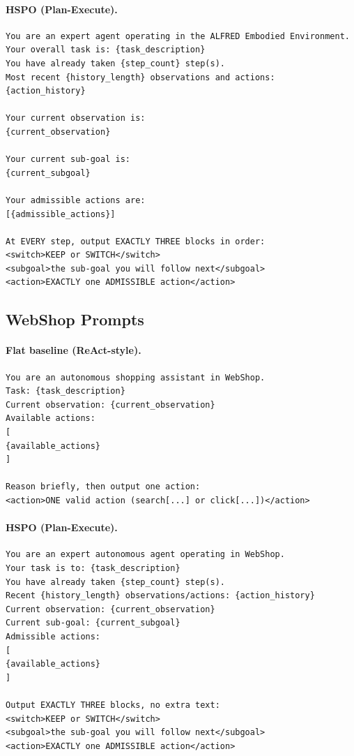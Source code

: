 \documentclass{article}
\begin{document}
\paragraph{HSPO (Plan-Execute).}
\begin{lstlisting}
You are an expert agent operating in the ALFRED Embodied Environment.
Your overall task is: {task_description}
You have already taken {step_count} step(s).
Most recent {history_length} observations and actions:
{action_history}

Your current observation is:
{current_observation}

Your current sub-goal is:
{current_subgoal}

Your admissible actions are:
[{admissible_actions}]

At EVERY step, output EXACTLY THREE blocks in order:
<switch>KEEP or SWITCH</switch>
<subgoal>the sub-goal you will follow next</subgoal>
<action>EXACTLY one ADMISSIBLE action</action>
\end{lstlisting}

\subsection{WebShop Prompts}
\label{app:webshop_prompts}

\paragraph{Flat baseline (ReAct-style).}
\begin{lstlisting}
You are an autonomous shopping assistant in WebShop.
Task: {task_description}
Current observation: {current_observation}
Available actions:
[
{available_actions}
]

Reason briefly, then output one action:
<action>ONE valid action (search[...] or click[...])</action>
\end{lstlisting}

\paragraph{HSPO (Plan-Execute).}
\begin{lstlisting}
You are an expert autonomous agent operating in WebShop.
Your task is to: {task_description}
You have already taken {step_count} step(s).
Recent {history_length} observations/actions: {action_history}
Current observation: {current_observation}
Current sub-goal: {current_subgoal}
Admissible actions:
[
{available_actions}
]

Output EXACTLY THREE blocks, no extra text:
<switch>KEEP or SWITCH</switch>
<subgoal>the sub-goal you will follow next</subgoal>
<action>EXACTLY one ADMISSIBLE action</action>
\end{lstlisting}
\end{document}
